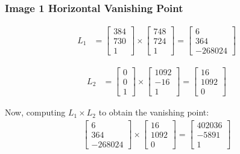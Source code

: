 \documentclass[12pt, oneside]{article}
\begin{document}
\subsubsection*{Image 1 Horizontal Vanishing Point}

\begin{align*}
L_1 &=    \begin{bmatrix}
            384 \\
            730 \\
            1
        \end{bmatrix} \times 
        \begin{bmatrix}
            748 \\
            724 \\
            1
        \end{bmatrix}  = 
        \begin{bmatrix}
            6  \\
            364 \\
            -268024 
        \end{bmatrix}                                                   
\end{align*}

\begin{align*}
L_2 &=    \begin{bmatrix}
            0 \\
            0 \\
            1
        \end{bmatrix} \times 
        \begin{bmatrix}
            1092 \\
            -16 \\
            1
        \end{bmatrix}  = 
        \begin{bmatrix}
            16  \\
            1092 \\
            0 
        \end{bmatrix}                                                   
\end{align*}

Now, computing $L_1 \times L_2$ to obtain the vanishing point:
\begin{align*}
    \begin{bmatrix}
        6  \\
        364 \\
        -268024 
    \end{bmatrix}     \times 
    \begin{bmatrix}
        16  \\
        1092 \\
        0 
    \end{bmatrix}    = 
    \begin{bmatrix}
        402036  \\
        -5891 \\
        1 
    \end{bmatrix}
\end{align*}
\end{document}
